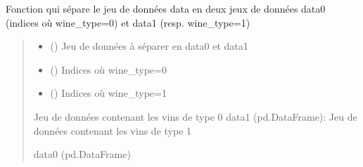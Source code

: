 \documentclass[letterpaper,10pt,french]{sphinxmanual}
\begin{document}
\begin{fulllineitems}
\label{\detokenize{dataset_division:dataset_division.formal_div}}
\pysigstartsignatures
{}
\pysigstopsignatures
\sphinxAtStartPar
Fonction qui sépare le jeu de données data en deux jeux de données data0 (indices où wine\_type=0) et data1 (resp. wine\_type=1)
\begin{quote}\begin{description}
\begin{itemize}
\item {} 
\sphinxAtStartPar
{} () \textendash{} Jeu de données à séparer en data0 et data1

\item {} 
\sphinxAtStartPar
{} () \textendash{} Indices où wine\_type=0

\item {} 
\sphinxAtStartPar
{} () \textendash{} Indices où wine\_type=1

\end{itemize}

\sphinxAtStartPar
Jeu de données contenant les vins de type 0
data1 (pd.DataFrame): Jeu de données contenant les vins de type 1

\sphinxAtStartPar
data0 (pd.DataFrame)

\end{description}\end{quote}

\end{fulllineitems}

\end{document}
